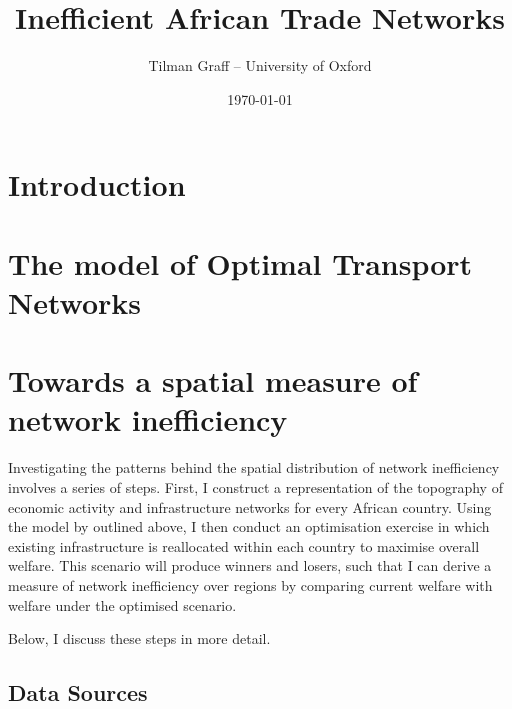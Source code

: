 \documentclass[11pt, oneside]{article}   	%
\title{Inefficient African Trade Networks}
\author{Tilman Graff -- University of Oxford}
\date{\today}
\begin{document}

\maketitle



\section{Introduction}

\section{The \cite{fajgelbaum_optimal_2017} model of Optimal Transport Networks}

\section{Towards a spatial measure of network inefficiency}

Investigating the patterns behind the spatial distribution of network inefficiency involves a series of steps. First, I construct a representation of the topography of economic activity and infrastructure networks for every African country. Using the model by \cite{fajgelbaum_optimal_2017} outlined above, I then conduct an optimisation exercise in which existing infrastructure is reallocated within each country to maximise overall welfare. This scenario will produce winners and losers, such that I can derive a measure of network inefficiency over regions by comparing current welfare with welfare under the optimised scenario.

Below, I discuss these steps in more detail.

\subsection{Data Sources}
\end{document}
